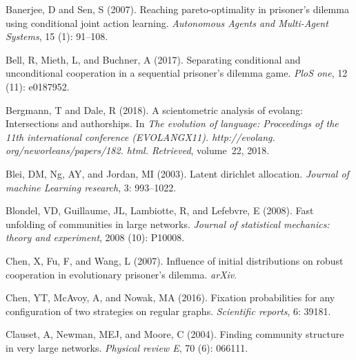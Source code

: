 \documentclass{article}
\theoremstyle{definition}
\begin{document}
\begin{thebibliography}{71}
    Banerjee, D and Sen, S (2007).
    \newblock Reaching pareto-optimality in prisoner’s dilemma using conditional
      joint action learning.
    \newblock \emph{Autonomous Agents and Multi-Agent Systems}, 15
      (1): 91--108.
    
    Bell, R, Mieth, L, and Buchner, A (2017).
    \newblock Separating conditional and unconditional cooperation in a sequential
      prisoner’s dilemma game.
    \newblock \emph{PloS one}, 12 (11): e0187952.
    
    Bergmann, T and Dale, R (2018).
    \newblock A scientometric analysis of evolang: Intersections and authorships.
    \newblock In \emph{The evolution of language: Proceedings of the 11th
      international conference (EVOLANGX11). http://evolang.
      org/neworleans/papers/182. html. Retrieved}, volume~22, 2018.
    
    Blei, DM, Ng, AY, and Jordan, MI (2003).
    \newblock Latent dirichlet allocation.
    \newblock \emph{Journal of machine Learning research}, 3: 993--1022.
    
    Blondel, VD, Guillaume, JL, Lambiotte, R, and Lefebvre, E (2008).
    \newblock Fast unfolding of communities in large networks.
    \newblock \emph{Journal of statistical mechanics: theory and experiment},
      2008 (10): P10008.
    
    Chen, X, Fu, F, and Wang, L (2007).
    \newblock Influence of initial distributions on robust cooperation in
      evolutionary prisoner's dilemma.
    \newblock \emph{arXiv}.
    
    Chen, YT, McAvoy, A, and Nowak, MA (2016).
    \newblock Fixation probabilities for any configuration of two strategies on
      regular graphs.
    \newblock \emph{Scientific reports}, 6: 39181.
    
    Clauset, A, Newman, MEJ, and Moore, C (2004).
    \newblock Finding community structure in very large networks.
    \newblock \emph{Physical review E}, 70 (6): 066111.
    

\end{thebibliography}
\end{document}
